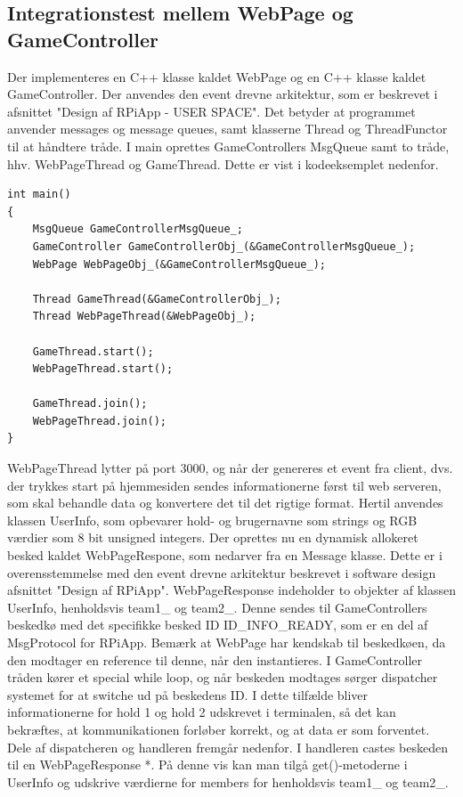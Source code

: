 \documentclass[Integrationstest/Integrationstest_main.tex]{subfiles}
\begin{document}
\subsection{Integrationstest mellem WebPage og GameController}
Der implementeres en C++ klasse kaldet WebPage og en C++ klasse kaldet GameController. Der anvendes den event drevne arkitektur, som er beskrevet i afsnittet "Design af RPiApp - USER SPACE". Det betyder at programmet anvender messages og message queues, samt klasserne Thread og ThreadFunctor til at håndtere tråde. I main oprettes GameControllers MsgQueue samt to tråde, hhv. WebPageThread og GameThread. Dette er vist i kodeeksemplet nedenfor.
\begin{lstlisting}
int main()
{
    MsgQueue GameControllerMsgQueue_;
    GameController GameControllerObj_(&GameControllerMsgQueue_);
    WebPage WebPageObj_(&GameControllerMsgQueue_);

    Thread GameThread(&GameControllerObj_);
    Thread WebPageThread(&WebPageObj_);

    GameThread.start();
    WebPageThread.start();
	
    GameThread.join();
    WebPageThread.join();
}
\end{lstlisting}
WebPageThread lytter på port 3000, og når der genereres et event fra client, dvs. der trykkes start på hjemmesiden sendes informationerne først til web serveren, som skal behandle data og konvertere det til det rigtige format. Hertil anvendes klassen UserInfo, som opbevarer hold- og brugernavne som strings og RGB værdier som 8 bit unsigned integers. Der oprettes nu en dynamisk allokeret besked kaldet WebPageRespone, som nedarver fra en Message klasse. Dette er i overensstemmelse med den event drevne arkitektur beskrevet i software design afsnittet "Design af RPiApp". WebPageResponse indeholder to objekter af klassen UserInfo, henholdsvis team1\_ og team2\_.  
Denne sendes til GameControllers beskedkø med det specifikke besked ID ID\_INFO\_READY, som er en del af MsgProtocol for RPiApp. Bemærk at WebPage har kendskab til beskedkøen, da den modtager en reference til denne, når den instantieres. I GameController tråden kører et special while loop, og når beskeden modtages sørger dispatcher systemet for at switche ud på beskedens ID. I dette tilfælde bliver informationerne for hold 1 og hold 2 udskrevet i terminalen, så det kan bekræftes, at kommunikationen forløber korrekt, og at data er som forventet. Dele af dispatcheren og handleren fremgår nedenfor. I handleren castes beskeden til en WebPageResponse *. På denne vis kan man tilgå get()-metoderne i UserInfo og udskrive værdierne for members for henholdsvis team1\_ og team2\_.
\end{document}
